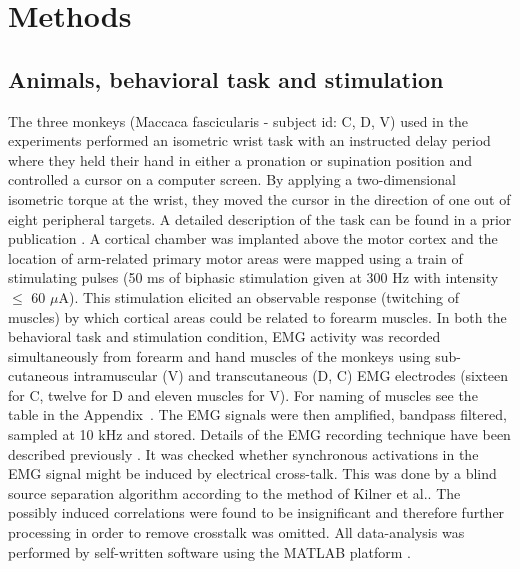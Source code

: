 \chapter{Methods} %
\label{sg:cha:methods}

% 
\section{Animals, behavioral task and stimulation} %
\label{sg:sec:animals_and_behavioral_task}

The three monkeys (Maccaca fascicularis - subject id: C, D, V) used in the experiments performed an isometric wrist task with an instructed delay period where they held their hand in either a pronation or supination position and controlled a cursor on a computer screen. By applying a two-dimensional isometric torque at the wrist, they moved the cursor in the direction of one out of eight peripheral targets. A detailed description of the task can be found in a prior publication \citet{Yanai:2007p2455}.
A cortical chamber was implanted above the motor cortex and the location of arm-related primary motor areas were mapped using a train of stimulating pulses (50 ms of biphasic stimulation given at 300 Hz with intensity $\leq$ 60 $\mu$A). This stimulation elicited an observable response (twitching of muscles) by which cortical areas could be related to forearm muscles. 
In both the behavioral task and stimulation condition, EMG activity was recorded simultaneously from forearm and hand muscles of the monkeys using sub-cutaneous intramuscular (V) and transcutaneous (D, C) EMG electrodes (sixteen for C, twelve for D and eleven muscles for V). For naming of muscles see the table in the Appendix~. The EMG signals were then amplified, bandpass filtered, sampled at 10 kHz and stored. Details of the EMG recording technique have been described previously \citet{Prut:2003p2780}. It was checked whether synchronous activations in the EMG signal might be induced by electrical cross-talk. This was done by a blind source separation algorithm\citet{Chan:2002p5339} according to the method of Kilner et al.\citet{Kilner:2002p5423}. The possibly induced correlations were found to be insignificant and therefore further processing in order to remove crosstalk was omitted. All data-analysis was performed by self-written software using the MATLAB platform \citep[see git repository of][]{synergies_code}.
